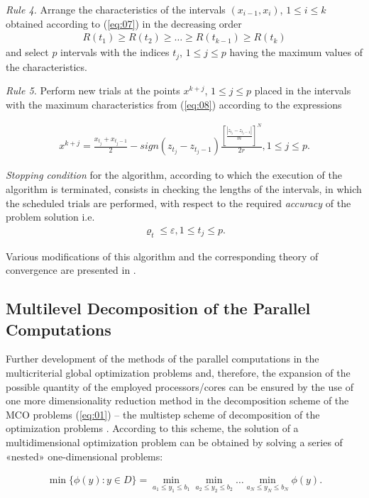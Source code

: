 \documentclass[runningheads]{llncs}
\begin{document}
\textit{Rule 4.} Arrange the characteristics of the intervals $(x_{i-1},x_i)$, $1 \leq i \leq k$ obtained according to (\ref{eq:07}) in the decreasing order 
\begin{eqnarray} \label{eq:08}
R(t_1) \geq R(t_2) \geq \dots \geq R(t_{k-1}) \geq R(t_k)
\end{eqnarray}
and select $p$ intervals with the indices $t_j$, $1 \leq j \leq p$ having the maximum values of the characteristics.

\textit{Rule 5.} Perform new trials at the points $x^{k+j}$, $1 \leq j \leq p$ placed in the intervals with the maximum characteristics from (\ref{eq:08}) according to the expressions 

\begin{eqnarray} \label{eq:09}
	x^{k+j} = \frac{x_{t_j} + x_{t_j-1}}{2}
	- sign(z_{t_j} - z_{t_j-1}) \frac{[\frac{|z_{t_j} - z_{t_j-1}|}{m}]^N}{2r} , 1\leq j \leq p.
\end{eqnarray}

\textit{Stopping condition} for the algorithm, according to which the execution of the algorithm is terminated, consists in checking the lengths of the intervals, in which the scheduled trials are performed, with respect to the required \textit{accuracy} of the problem solution i.e.
\begin{eqnarray} \label{eq:10}
\varrho_t \leq \varepsilon, 1 \leq t_j \leq p.
\end{eqnarray}

Various modifications of this algorithm and the corresponding theory of convergence are presented in \cite{c11,c12}.

\subsection{Multilevel Decomposition of the Parallel Computations}

Further development of the methods of the parallel computations in the multicriterial global optimization problems and, therefore, the expansion of the possible quantity of the employed processors/cores can be ensured by the use of one more dimensionality reduction method in the decomposition scheme of the MCO problems (\ref{eq:01}) -- the multistep scheme of decomposition of the optimization problems \cite{c11,c12,c33,c34}. According to this scheme, the solution of a multidimensional optimization problem can be obtained by solving a series of «nested» one-dimensional problems:

\begin{eqnarray} \label{eq:11}
\min{\{\phi(y): y \in D\}} = 
\min_{a_1 \leq y_1 \leq b_1}{ \min_{a_2 \leq y_2 \leq b_2}{ \dots \min_{a_N \leq y_N \leq b_N}{ \phi(y) } } }.
\end{eqnarray}
\end{document}
